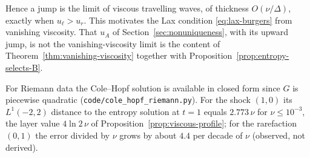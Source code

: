 Hence a jump is the limit of viscous travelling waves, of thickness
$O(\nu/\Delta)$, exactly when $u_\ell>u_r$. This motivates the Lax condition
\eqref{eq:lax-burgers} from vanishing viscosity. That $u_A$ of
Section~\ref{sec:nonuniqueness}, with its upward jump, is not the
vanishing-viscosity limit is the content of Theorem~\ref{thm:vanishing-viscosity}
together with Proposition~\ref{prop:entropy-selects-B}.

For Riemann data the Cole--Hopf solution is available in closed form since $G$ is
piecewise quadratic (\texttt{code/cole\_hopf\_riemann.py}). For the shock $(1,0)$ its
$L^1(-2,2)$ distance to the entropy solution at $t=1$ equals $2.773\,\nu$ for
$\nu\le10^{-3}$, the layer value $4\ln2\,\nu$ of
Proposition~\ref{prop:viscous-profile}; for the rarefaction $(0,1)$ the error
divided by $\nu$ grows by about $4.4$ per decade of $\nu$ (observed, not derived).